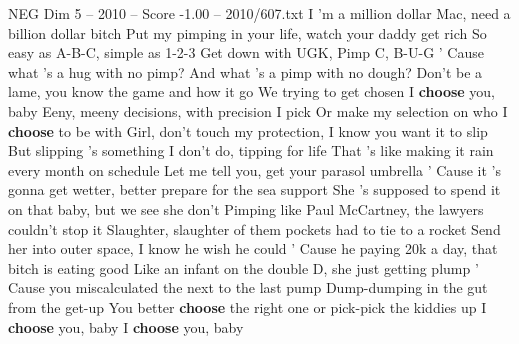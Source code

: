 \begin{textsample}{NEG Dim 5 – 2010 – Score -1.00 – 2010/607.txt}
I 'm a million dollar Mac, need a billion dollar bitch Put my pimping in your life, watch your daddy get rich So easy as A-B-C, simple as 1-2-3 Get down with UGK, Pimp C, B-U-G ' Cause what 's a hug with no pimp?
And what 's a pimp with no dough?
Don't be a lame, you know the game and how it go We trying to get chosen I \textbf{choose} you, baby Eeny, meeny decisions, with precision I pick Or make my selection on who I \textbf{choose} to be with Girl, don't touch my protection, I know you want it to slip But slipping 's something I don't do, tipping for life That 's like making it rain every month on schedule Let me tell you, get your parasol umbrella ' Cause it 's gonna get wetter, better prepare for the sea support She 's supposed to spend it on that baby, but we see she don't Pimping like Paul McCartney, the lawyers couldn't stop it Slaughter, slaughter of them pockets had to tie to a rocket Send her into outer space, I know he wish he could ' Cause he paying 20k a day, that bitch is eating good Like an infant on the double D, she just getting plump ' Cause you miscalculated the next to the last pump Dump-dumping in the gut from the get-up You better \textbf{choose} the right one or pick-pick the kiddies up I \textbf{choose} you, baby I \textbf{choose} you, baby

\end{textsample}
